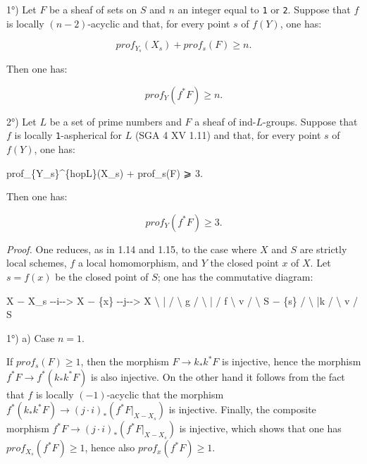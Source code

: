 \documentclass[
  11pt,
  a4paper,
]{book}
\newenvironment{Shaded}{}{}
\newcommand{\NormalTok}[1]{#1}
\begin{document}
1°) Let \(F\) be a sheaf of sets on \(S\) and \(n\) an integer equal to
\texttt{1} or \texttt{2}. Suppose that \(f\) is locally \((n -
2)\)-acyclic and that, for every point \(s\) of \(f(Y)\), one has:

\[ prof_{Y_{s}}(X_{s}) + prof_{s}(F) \geqslant n. \]

Then one has:

\[ prof_{Y}(f^{*} F) \geqslant n. \]

2°) Let \(L\) be a set of prime numbers and \(F\) a sheaf of
ind-\(L\)-groups. Suppose that \(f\) is locally \texttt{1}-aspherical
for \(L\) (SGA 4 XV 1.11) and that, for every point \(s\) of \(f(Y)\),
one has:

\begin{Shaded}
\begin{Highlighting}[]
\NormalTok{prof\_\{Y\_s\}\^{}\{hopL\}(X\_s) + prof\_s(F) ⩾ 3.}
\end{Highlighting}
\end{Shaded}

Then one has:

\[ prof_{Y}(f^{*} F) \geqslant 3. \]

\emph{Proof.} One reduces, as in 1.14 and 1.15, to the case where \(X\)
and \(S\) are strictly local schemes, \(f\) a local homomorphism, and
\(Y\) the closed point \(x\) of \(X\). Let \(s = f(x)\) be the closed
point of \(S\); one has the commutative diagram:

\begin{Shaded}
\begin{Highlighting}[]
\NormalTok{X − X\_s {-}{-}i{-}{-}\textgreater{} X − \{x\} {-}{-}j{-}{-}\textgreater{} X}
\NormalTok{        \textbackslash{}         |          /}
\NormalTok{         \textbackslash{}        g         /}
\NormalTok{          \textbackslash{}       |        / f}
\NormalTok{           \textbackslash{}      v       /}
\NormalTok{            \textbackslash{}   S − \{s\}  /}
\NormalTok{             \textbackslash{}    |k    /}
\NormalTok{              \textbackslash{}   v    /}
\NormalTok{                  S}
\end{Highlighting}
\end{Shaded}

1°) a) Case \(n = 1\).

If \(prof_{s}(F) \geqslant 1\), then the morphism
\(F \to k_{*} k^{*} F\) is injective, hence the morphism \(f^{*} F \to
f^{*}(k_{*} k^{*} F)\) is also injective. On the other hand it follows
from the fact that \(f\) is locally \((-1)\)-acyclic that the morphism
\(f^{*}(k_{*} k^{*} F) \to (j \cdot i)_{*}(f^{*} F|_{X - X_{s}})\) is
injective. Finally, the composite morphism
\(f^{*} F \to (j \cdot i)_{*}(f^{*} F|_{X - X_{s}})\) is injective,
which shows that one has \(prof_{X_{s}}(f^{*}
F) \geqslant 1\), hence also \(prof_{x}(f^{*} F) \geqslant 1\).
\end{document}
